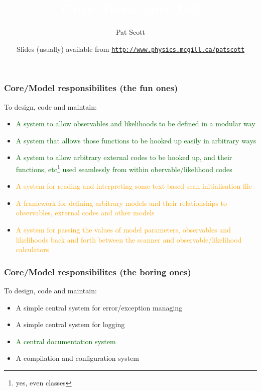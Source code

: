 \documentclass[xcolor=dvipsnames]{beamer}
\title[{\textcolor{white}Core Show and Tell}]{\textcolor{white}{Core Show and Tell}}
\author[\textcolor{medgrey}{Pat Scott -- Jul 15 -- GAMBIT II, Stockholm}]{Pat Scott}
\institute{\small{Department of Physics, McGill University}}
\date[Oct 8 2012]{Slides (usually) available from \color[rgb]{0.1, 0.2, 0.6} \href{http://www.physics.mcgill.ca/~patscott}{\tt http://www.physics.mcgill.ca/{\urltilda}patscott}}
\begin{document}
\begin{frame}
  \titlepage
\end{frame}

\begin{frame}
\frametitle{Core/Model responsibilites (the fun ones)}

To design, code and maintain:\small
\begin{itemize}
\item \textcolor<2->{darkgreen}{A system to allow observables and likelihoods to be defined in a modular way }
\item \textcolor<3->{darkgreen}{A system that allows those functions to be hooked up easily in arbitrary ways }
\item \textcolor<4->{darkgreen}{A system to allow arbitrary external codes to be hooked up, and their functions, etc\textcolor<4->{orange}{\footnote{\tiny yes, even classes}} used seamlessly from within obervable/likelihood codes }
\item \textcolor<5->{orange}{A system for reading and interpreting some text-based scan initialisation file }
\item \textcolor<6->{orange}{A framework for defining arbitrary models and their relationships to observables, external codes and other models }
\item \textcolor<7->{orange}{A system for passing the values of model parameters, observables and likelihoods back and forth between the scanner and observable/likelihood calculators }
\end{itemize}
	
\end{frame}


\begin{frame}
\frametitle{Core/Model responsibilites (the boring ones)}

To design, code and maintain:
\begin{itemize}
\item \alert<2->{A simple central system for error/exception managing}
\item \alert<3->{A simple central system for logging}
\item \textcolor<4->{darkgreen}{A central documentation system }
\item \alert<5>{A compilation and configuration system}
\end{itemize}

\end{frame}
\end{document}
